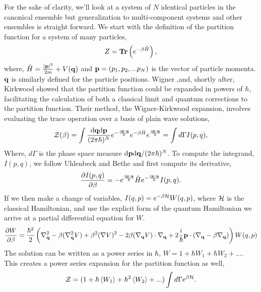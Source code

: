 For the sake of clarity, we'll look at a system of $N$ identical particles in the canonical ensemble but generalization to multi-component systems and other ensembles is straight forward. 
We start with the definition of the partition function for a system of many particles,  
\begin{equation}
    Z = \mathbf{Tr}\left( e^{-\beta\hat{H}} \right),
\end{equation} 
where, $\hat{H} = \frac{\vert\mathbf{p}\vert^2}{2m} + V(\mathbf{q})$ and $\mathbf{p} = (p_1, p_2, ...p_N)$ is the vector of particle momenta. 
$\mathbf{q}$ is similarly defined for the particle positions.
Wigner \cite{PhysRev.40.749},and, shortly after, Kirkwood \cite{PhysRev.44.31} showed that the partition function could be expanded in powers of $\hbar$, facilitating the calculation of both a classical limit and quantum corrections to the partition function.
Their method, the Wigner-Kirkwood expansion, involves evaluating the trace operation over a basis of plain wave solutions,
\begin{equation}
	\mathcal{Z}(\beta) = \int 
		\frac{\mathrm{d}\mathbf{q} \mathrm{d}\mathbf{p}}{(2\pi \hbar)^N}
		e^{-\frac{i\mathbf{p}\cdot\mathbf{q}}{\hbar}}
		e^{-\beta \hat{H}}
		e^{\frac{i\mathbf{p}\cdot\mathbf{q}}{\hbar}} = \int d\Gamma I(p, q),
\end{equation}
Where, $d\Gamma$ is the phase space measure $\mathrm{d}\mathbf{p}\mathrm{d}\mathbf{q}/(2\pi\hbar)^N$.
To compute the integrand, $I(p, q)$, we follow Uhlenbeck and Bethe \cite{Uhlenbeck1936729} and first compute its derivative,
\begin{equation}
	\frac{\partial I(p, q)}{\partial \beta} = -e^{\frac{i\mathbf{p}\cdot\mathbf{q}}{\hbar}}\hat{H}e^{-\frac{i\mathbf{p}\cdot\mathbf{q}}{\hbar}} I(p, q).
\end{equation}
If we then make a change of variables, $I(q, p) = e^{-\beta\mathcal{H}}W(q, p)$, where $\mathcal{H}$ is the classical Hamiltonian, and use the explicit form of the quantum Hamiltonian we arrive at a partial differential equation for $W$.
\begin{equation}
	\frac{\partial W}{\partial \beta} = \frac{\hbar^2}{2} \left(
		\nabla_{\mathbf{q}}^2 - 
		\beta(\nabla_{\mathbf{q}}^2V) + 
		\beta^2(\nabla V)^2 -
		2\beta(\nabla_{\mathbf{q}} V)\cdot\nabla_{\mathbf{q}} + 
		2 \frac{i}{\hbar}\mathbf{p}\cdot(\nabla_{\mathbf{q}} - \beta\nabla_{\mathbf{q}})
	\right)W(q, p)
\end{equation}
The solution can be written as a power series in $\hbar$, $W = 1 + \hbar W_1 + \hbar W_2 + ...$.
This creates a power series expansion for the partition function as well,
\begin{equation}
    \mathcal{Z} = (1 + \hbar \left\langle W_1 \right\rangle + \hbar^2 \left\langle W_2 \right\rangle+ ...) 
    \int d\Gamma e^{\beta\mathcal{H}}.
\end{equation}
